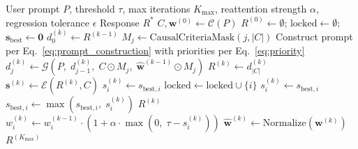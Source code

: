 \documentclass[11pt]{article}
\newcommand{\efa}{\textsc{EFA}}  %
\newcommand{\calC}{\mathcal{C}}
\newcommand{\calG}{\mathcal{G}}
\newcommand{\calE}{\mathcal{E}}
\begin{document}
\begin{algorithm}[H]
\caption{Evaluation-First Architecture (\efa{})}
\label{alg:efa}
\begin{algorithmic}[1]
\REQUIRE User prompt $P$, threshold $\tau$, max iterations $K_{\max}$, reattention strength $\alpha$, regression tolerance $\epsilon$
\ENSURE Response $R^*$
\STATE $C, \mathbf{w}^{(0)} \leftarrow \calC(P)$ 
\STATE $R^{(0)} \leftarrow \emptyset$; \; $\text{locked} \leftarrow \emptyset$; \; $\mathbf{s}_{\text{best}} \leftarrow \mathbf{0}$
    \STATE {}
    \STATE $d_0^{(k)} \leftarrow R^{(k-1)}$
        \STATE $M_j \leftarrow \text{CausalCriteriaMask}(j, |C|)$
        \STATE Construct prompt per Eq.~\ref{eq:prompt_construction} with priorities per Eq.~\ref{eq:priority}
        \STATE $d_j^{(k)} \leftarrow \calG(P, \; d_{j-1}^{(k)}, \; C \odot M_j, \; \hat{\mathbf{w}}^{(k-1)} \odot M_j)$
    \ENDFOR
    \STATE $R^{(k)} \leftarrow d_{|C|}^{(k)}$
    \STATE
    \STATE {}
    \STATE $\mathbf{s}^{(k)} \leftarrow \calE(R^{(k)}, C)$
    \STATE
    \STATE {}
            \STATE $s_i^{(k)} \leftarrow s_{\text{best},i}$ 
            \STATE $\text{locked} \leftarrow \text{locked} \cup \{i\}$ 
            \STATE $s_i^{(k)} \leftarrow s_{\text{best},i}$
        \ELSE
            \STATE $s_{\text{best},i} \leftarrow \max(s_{\text{best},i}, \; s_i^{(k)})$
        \ENDIF
    \ENDFOR
    \STATE
        \RETURN $R^{(k)}$ 
    \ENDIF
    \STATE
    \STATE {}
            \STATE $w_i^{(k)} \leftarrow w_i^{(k-1)} \cdot (1 + \alpha \cdot \max(0, \; \tau - s_i^{(k)}))$
        \ENDIF
    \ENDFOR
    \STATE $\hat{\mathbf{w}}^{(k)} \leftarrow \text{Normalize}(\mathbf{w}^{(k)})$
\ENDFOR
\RETURN $R^{(K_{\max})}$
\end{algorithmic}
\end{algorithm}

\end{document}
